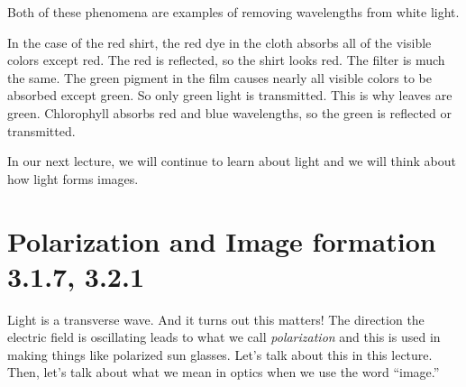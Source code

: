 \documentclass{article}
\begin{document}
Both of these phenomena are examples of removing wavelengths from white
light.

In the case of the red shirt, the red dye in the cloth absorbs all of the
visible colors except red. The red is reflected, so the shirt looks red. The
filter is much the same. The green pigment in the film causes nearly all
visible colors to be absorbed except green. So only green light is
transmitted. This is why leaves are green. Chlorophyll absorbs red and blue
wavelengths, so the green is reflected or transmitted.


In our next lecture, we will continue to learn about light and we will think
about how light forms images.

\section{Polarization and Image formation 3.1.7, 3.2.1}

Light is a transverse wave. And it turns out this matters! The direction the
electric field is oscillating leads to what we call \emph{polarization} and
this is used in making things like polarized sun glasses. Let's talk about
this in this lecture. Then, let's talk about what we mean in optics when we
use the word \textquotedblleft image.\textquotedblright

\vspace{0.10in}%
\end{document}
